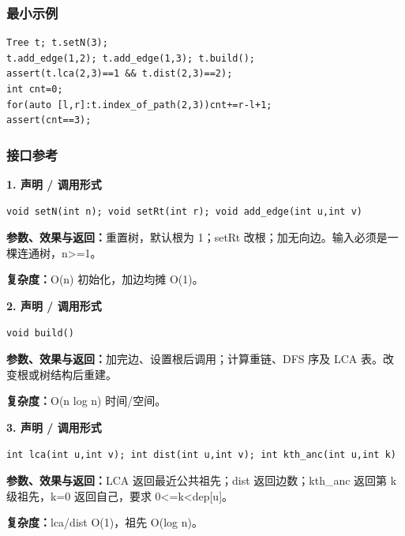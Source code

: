 \documentclass[UTF8,a4paper,10pt]{ctexart}
\begin{document}
\subsubsection*{最小示例}
\begin{lstlisting}
Tree t; t.setN(3);
t.add_edge(1,2); t.add_edge(1,3); t.build();
assert(t.lca(2,3)==1 && t.dist(2,3)==2);
int cnt=0;
for(auto [l,r]:t.index_of_path(2,3))cnt+=r-l+1;
assert(cnt==3);
\end{lstlisting}
\subsubsection*{接口参考}
\noindent\begin{minipage}{\textwidth}
\textbf{1. 声明 / 调用形式}
\begin{lstlisting}
void setN(int n); void setRt(int r); void add_edge(int u,int v)
\end{lstlisting}
\textbf{参数、效果与返回：}重置树，默认根为 1；setRt 改根；加无向边。输入必须是一棵连通树，n>=1。

\textbf{复杂度：}O(n) 初始化，加边均摊 O(1)。

\end{minipage}\par\vspace{0.4em}
\noindent\begin{minipage}{\textwidth}
\textbf{2. 声明 / 调用形式}
\begin{lstlisting}
void build()
\end{lstlisting}
\textbf{参数、效果与返回：}加完边、设置根后调用；计算重链、DFS 序及 LCA 表。改变根或树结构后重建。

\textbf{复杂度：}O(n log n) 时间/空间。

\end{minipage}\par\vspace{0.4em}
\noindent\begin{minipage}{\textwidth}
\textbf{3. 声明 / 调用形式}
\begin{lstlisting}
int lca(int u,int v); int dist(int u,int v); int kth_anc(int u,int k)
\end{lstlisting}
\textbf{参数、效果与返回：}LCA 返回最近公共祖先；dist 返回边数；kth\_anc 返回第 k 级祖先，k=0 返回自己，要求 0<=k<dep[u]。

\textbf{复杂度：}lca/dist O(1)，祖先 O(log n)。

\end{minipage}\par\vspace{0.4em}
\end{document}
